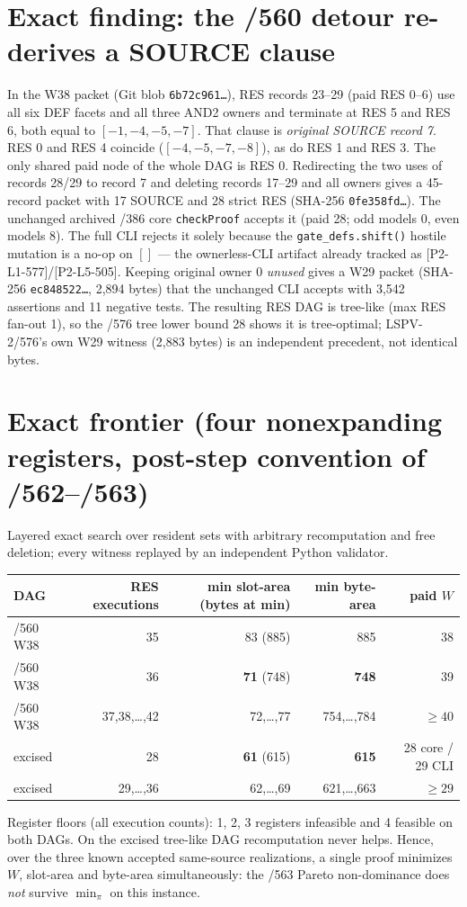 \documentclass[10pt]{article}
\begin{document}
\section*{Exact finding: the /560 detour re-derives a SOURCE clause}
In the W38 packet (Git blob \texttt{6b72c961\ldots}), RES records 23--29 (paid RES 0--6) use all six DEF facets and all three
AND2 owners and terminate at RES 5 and RES 6, both equal to \([-1,-4,-5,-7]\).  That clause is \emph{original SOURCE record 7}.
RES 0 and RES 4 coincide (\([-4,-5,-7,-8]\)), as do RES 1 and RES 3.  The only shared paid node of the whole DAG is RES 0.
Redirecting the two uses of records 28/29 to record 7 and deleting records 17--29 and all owners gives a
45-record packet with 17 SOURCE and 28 strict RES (SHA-256 \texttt{0fe358fd\ldots}).  The unchanged archived /386 core
\texttt{checkProof} accepts it (paid 28; odd models 0, even models 8).  The full CLI rejects it solely because the
\texttt{gate\_defs.shift()} hostile mutation is a no-op on \([]\) --- the ownerless-CLI artifact already tracked as [P2-L1-577]/[P2-L5-505].
Keeping original owner 0 \emph{unused} gives a W29 packet (SHA-256 \texttt{ec848522\ldots}, 2,894 bytes) that the unchanged CLI accepts
with 3,542 assertions and 11 negative tests.  The resulting RES DAG is tree-like (max RES fan-out 1), so the /576 tree lower bound 28 shows it is
tree-optimal; LSPV-2/576's own W29 witness (2,883 bytes) is an independent precedent, not identical bytes.

\section*{Exact frontier (four nonexpanding registers, post-step convention of /562--/563)}
Layered exact search over resident sets with arbitrary recomputation and free deletion; every witness replayed by an independent Python validator.
\begin{center}\begin{tabular}{lrrrr}\toprule
DAG & RES executions & min slot-area (bytes at min) & min byte-area & paid \(W\)\\\midrule
/560 W38 & 35 & 83 (885) & 885 & 38\\
/560 W38 & 36 & \textbf{71} (748) & \textbf{748} & 39\\
/560 W38 & 37,38,\ldots,42 & 72,\ldots,77 & 754,\ldots,784 & \(\ge40\)\\
excised & 28 & \textbf{61} (615) & \textbf{615} & 28 core / 29 CLI\\
excised & 29,\ldots,36 & 62,\ldots,69 & 621,\ldots,663 & \(\ge29\)\\\bottomrule
\end{tabular}\end{center}
Register floors (all execution counts): 1, 2, 3 registers infeasible and 4 feasible on both DAGs.  On the excised tree-like DAG recomputation never helps.
Hence, over the three known accepted same-source realizations, a single proof minimizes \(W\), slot-area and byte-area simultaneously: the /563 Pareto
non-dominance does \emph{not} survive \(\min_\pi\) on this instance.
\end{document}
